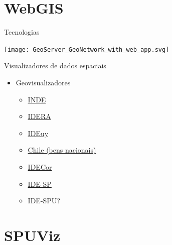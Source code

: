 \documentclass[9pt,ignorenonframetext,]{beamer}
\providecommand{\tightlist}{%
  \setlength{\itemsep}{0pt}\setlength{\parskip}{0pt}}
\begin{document}
\hypertarget{webgis}{%
\section{WebGIS}\label{webgis}}

\begin{frame}{Tecnologias}
\protect\hypertarget{tecnologias}{}

\begin{center}\texttt{[image: GeoServer\_GeoNetwork\_with\_web\_app.svg]} \end{center}

\end{frame}

\begin{frame}{Visualizadores de dados espaciais}
\protect\hypertarget{visualizadores-de-dados-espaciais}{}

\begin{itemize}[<+->]
\tightlist
\item
  Geovisualizadores

  \begin{itemize}[<+->]
  \tightlist
  \item
    \href{https://visualizador.inde.gov.br/}{INDE}
  \item
    \href{https://mapa.idera.gob.ar/}{IDERA}
  \item
    \href{https://www.gub.uy/infraestructura-datos-espaciales/publico/visualizador}{IDEuy}
  \item
    \href{http://www.catastro.cl/}{Chile (bens nacionais)}
  \item
    \href{https://idecor.cba.gov.ar/}{IDECor}
  \item
    \href{http://www.idesp.sp.gov.br/Visualizador}{IDE-SP}
  \item
    IDE-SPU?
  \end{itemize}
\end{itemize}

\end{frame}

\hypertarget{spuviz}{%
\section{SPUViz}\label{spuviz}}
\end{document}
